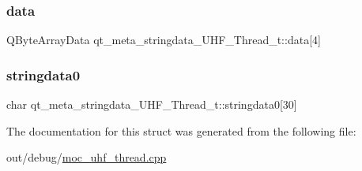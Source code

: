 \subsubsection{\texorpdfstring{data}{data}}
{\footnotesize\ttfamily Q\+Byte\+Array\+Data qt\+\_\+meta\+\_\+stringdata\+\_\+\+U\+H\+F\+\_\+\+Thread\+\_\+t\+::data\mbox{[}4\mbox{]}}

\mbox{\label{structqt__meta__stringdata___u_h_f___thread__t_a65803f48c35456c264a6760f689b9b8e}} 
\subsubsection{\texorpdfstring{stringdata0}{stringdata0}}
{\footnotesize\ttfamily char qt\+\_\+meta\+\_\+stringdata\+\_\+\+U\+H\+F\+\_\+\+Thread\+\_\+t\+::stringdata0\mbox{[}30\mbox{]}}



The documentation for this struct was generated from the following file\+:\begin{DoxyCompactItemize}
\item 
out/debug/\mbox{\hyperlink{moc__uhf__thread_8cpp}{moc\+\_\+uhf\+\_\+thread.\+cpp}}\end{DoxyCompactItemize}
